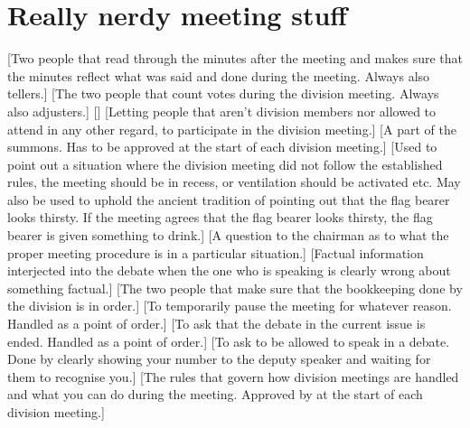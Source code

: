 \documentclass[a4paper]{dtek}
\begin{document}
\section{Really nerdy meeting stuff}
\begin{description}
    [Two people that read through the minutes after the meeting and makes sure that the minutes reflect what was said and done during the meeting. Always also tellers.]
    [The two people that count votes during the division meeting. Always also adjusters.]
    []
    [Letting people that aren't division members nor allowed to attend in any other regard, to participate in the division meeting.]
    [A part of the summons. Has to be approved at the start of each division meeting.]
    [Used to point out a situation where the division meeting did not follow the established rules, the meeting should be in recess, or ventilation should be activated etc. May also be used to uphold the ancient tradition of pointing out that the flag bearer looks thirsty. If the meeting agrees that the flag bearer looks thirsty, the flag bearer is given something to drink.]
    [A question to the chairman as to what the proper meeting procedure is in a particular situation.]
    [Factual information interjected into the debate when the one who is speaking is clearly wrong about something factual.]
    [The two people that make sure that the bookkeeping done by the division is in order.]
    [To temporarily pause the meeting for whatever reason. Handled as a point of order.]
    [To ask that the debate in the current issue is ended. Handled as a point of order.]
    [To ask to be allowed to speak in a debate. Done by clearly showing your number to the deputy speaker and waiting for them to recognise you.]
    [The rules that govern how division meetings are handled and what you can do during the meeting. Approved by at the start of each division meeting.]
\end{description}
\end{document}
